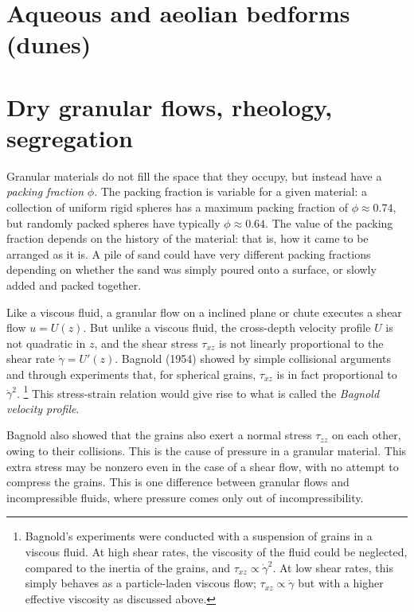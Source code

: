 \section{Aqueous and aeolian bedforms (dunes)}

\section{Dry granular flows, rheology, segregation}

Granular materials do not fill the space that they occupy, but instead have a
\textit{packing fraction} $\phi$. The packing fraction is variable for a given
material: a collection of uniform rigid spheres has a maximum packing fraction
of $\phi\approx0.74$, but randomly packed spheres have typically
$\phi\approx0.64$. The value of the packing fraction depends on the history of
the material: that is, how it came to be arranged as it is. A pile of sand could
have very different packing fractions depending on whether the sand was simply
poured onto a surface, or slowly added and packed together. 

Like a viscous fluid, a granular flow on a inclined plane or chute executes a
shear flow $u = U(z)$. But unlike a viscous fluid, the cross-depth velocity
profile $U$ is not quadratic in $z$, and the shear stress $\tau_{xz}$ is not linearly
proportional to the shear rate $\dot\gamma = U'(z)$. Bagnold (1954) showed by
simple collisional arguments and through experiments that, for spherical grains,
$\tau_{xz}$ is in fact proportional to $\dot\gamma^2$.\cite{bagnold-1954}
\footnote{Bagnold's experiments were conducted with a suspension of grains in a
viscous fluid. At high shear rates, the viscosity of the fluid could be
neglected, compared to the inertia of the grains, and $\tau_{xz}\propto\dot\gamma^2$.
At low shear rates, this simply behaves as a particle-laden viscous flow;
$\tau_{xz}\propto\dot\gamma$ but with a higher effective viscosity as discussed
above.}
This stress-strain relation would give rise to what is called the
\textit{Bagnold velocity profile}.

Bagnold also showed that the grains also exert a normal stress
$\tau_{zz}$ on each other, owing to their collisions. This is the cause of
pressure in a granular material. This extra stress may be nonzero even in the
case of a shear flow, with no attempt to compress the grains. This is one
difference between granular flows and incompressible fluids, where pressure
comes only out of incompressibility.

